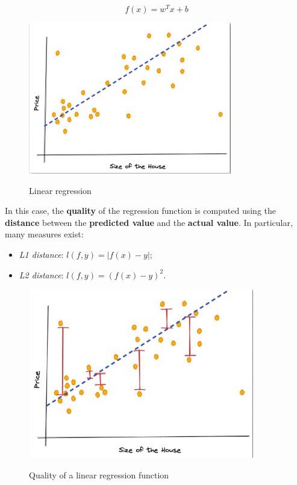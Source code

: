 $$
f(x) = w^Tx + b
$$

\begin{figure}[h!]
		\centering
		\includegraphics[scale = 1.6]{img/linear regression.jpg}
        \label{linear regression}
        \caption{Linear regression}
\end{figure}

In this case, the \textbf{quality} of the regression function is computed using the \textbf{distance} between the \textbf{predicted value} and the \textbf{actual value}. In particular, many measures exist:

\begin{itemize}
    \item \textit{L1 distance}: $l(f,y) = |f(x) - y|$;
    \item \textit{L2 distance}: $l(f,y) = (f(x) - y)^2$.
\end{itemize}

\begin{figure}[h!]
		\centering
		\includegraphics[scale = 1.6]{img/linear regression quality.jpg}
        \label{linear regression quality}
        \caption{Quality of a linear regression function}
\end{figure}

